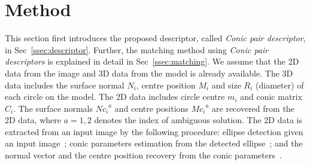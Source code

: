\documentclass{bmvc2k}
\newcommand{\sref}[1]{Sec\bmvaOneDot~\ref{#1}}
\newcommand{\hemal}[2]{\textcolor{red}{\sout{#1}} \textcolor{green}{#2}}
\def\etal{\emph{et al}\bmvaOneDot}
\begin{document}
\section{Method}
This section first introduces the proposed descriptor, called {\textit{Conic pair descriptor}}, in \sref{ssec:descriptor}.  Further, the matching method using \textit{Conic pair descriptors} is explained in detail in \sref{ssec:matching}.
We assume that the 2D data from the image and 3D data from the model is already available.
The 3D data includes the surface normal $N_i$, centre position $M_i$ and size $R_i$ (diameter) of each circle on the model. 
The 2D data includes circle centre $ m_i $ and conic matrix $ C_i $.
The surface normals ${Nc_i}^a$ and centre positions ${Mc_i}^a$ are recovered from the 2D data, where $a ={1,2}$ denotes the index of ambiguous solution. 
The 2D data is extracted from an input image by the following procedure:
ellipse detection given an input image~\cite{naimark_circular_2002};
conic parameters estimation from the detected ellipse~\cite{farin_geometry_1998}; and
the normal vector and the centre position recovery from the conic parameters~\cite{lo_pez_de_ipin_a_trip:_2002}.
\end{document}
